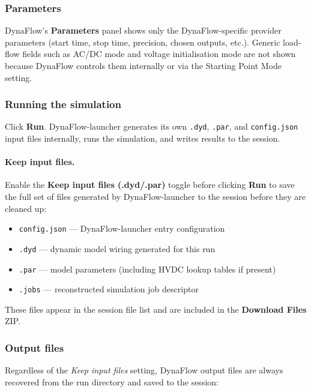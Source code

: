 \documentclass[a4paper,11pt]{article}
\newcommand{\code}[1]{\texttt{\small #1}}
\begin{document}
\subsubsection{Parameters}

DynaFlow's \textbf{Parameters} panel shows only the DynaFlow-specific provider
parameters (start time, stop time, precision, chosen outputs, etc.). Generic
load-flow fields such as AC/DC mode and voltage initialisation mode are not
shown because DynaFlow controls them internally or via the Starting Point Mode
setting.

\subsubsection{Running the simulation}

Click \textbf{Run}. DynaFlow-launcher generates its own \code{.dyd},
\code{.par}, and \code{config.json} input files internally, runs the simulation,
and writes results to the session.

\paragraph{Keep input files.}
Enable the \textbf{Keep input files (.dyd/.par)} toggle before clicking
\textbf{Run} to save the full set of files generated by DynaFlow-launcher to
the session before they are cleaned up:

\begin{itemize}[leftmargin=2em]
  \item \code{config.json} --- DynaFlow-launcher entry configuration
  \item \code{*.dyd} --- dynamic model wiring generated for this run
  \item \code{*.par} --- model parameters (including HVDC lookup tables if present)
  \item \code{*.jobs} --- reconstructed simulation job descriptor
\end{itemize}

These files appear in the session file list and are included in the
\textbf{Download Files} ZIP.

\subsubsection{Output files}

Regardless of the \emph{Keep input files} setting, DynaFlow output files are
always recovered from the run directory and saved to the session:
\end{document}
